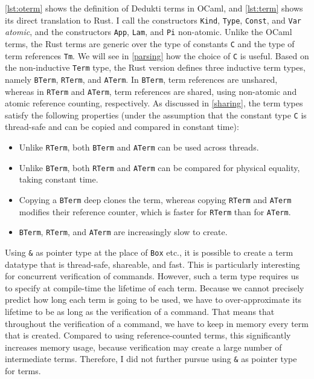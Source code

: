 \documentclass[screen,sigplan,10pt]{acmart}
\providecommand{\tightlist}{}
\begin{document}
\autoref{lst:oterm} shows the definition of Dedukti terms in OCaml, and
\autoref{lst:term} shows its direct translation to Rust. I call the
constructors \texttt{Kind}, \texttt{Type}, \texttt{Const}, and
\texttt{Var} \emph{atomic}, and the constructors \texttt{App},
\texttt{Lam}, and \texttt{Pi} non-atomic. Unlike the OCaml terms, the
Rust terms are generic over the type of constants \texttt{C} and the
type of term references \texttt{Tm}. We will see in \autoref{parsing}
how the choice of \texttt{C} is useful. Based on the non-inductive
\texttt{Term} type, the Rust version defines three inductive term types,
namely \texttt{BTerm}, \texttt{RTerm}, and \texttt{ATerm}. In
\texttt{BTerm}, term references are unshared, whereas in \texttt{RTerm}
and \texttt{ATerm}, term references are shared, using non-atomic and
atomic reference counting, respectively. As discussed in
\autoref{sharing}, the term types satisfy the following properties
(under the assumption that the constant type \texttt{C} is thread-safe
and can be copied and compared in constant time):

\begin{itemize}
\tightlist
\item
  Unlike \texttt{RTerm}, both \texttt{BTerm} and \texttt{ATerm} can be
  used across threads.
\item
  Unlike \texttt{BTerm}, both \texttt{RTerm} and \texttt{ATerm} can be
  compared for physical equality, taking constant time.
\item
  Copying a \texttt{BTerm} deep clones the term, whereas copying
  \texttt{RTerm} and \texttt{ATerm} modifies their reference counter,
  which is faster for \texttt{RTerm} than for \texttt{ATerm}.
\item
  \texttt{BTerm}, \texttt{RTerm}, and \texttt{ATerm} are increasingly
  slow to create.
\end{itemize}

Using \texttt{\&} as pointer type at the place of \texttt{Box} etc., it
is possible to create a term datatype that is thread-safe, shareable,
and fast. This is particularly interesting for concurrent verification
of commands. However, such a term type requires us to specify at
compile-time the lifetime of each term. Because we cannot precisely
predict how long each term is going to be used, we have to
over-approximate its lifetime to be as long as the verification of a
command. That means that throughout the verification of a command, we
have to keep in memory every term that is created. Compared to using
reference-counted terms, this significantly increases memory usage,
because verification may create a large number of intermediate terms.
Therefore, I did not further pursue using \texttt{\&} as pointer type
for terms.
\end{document}
